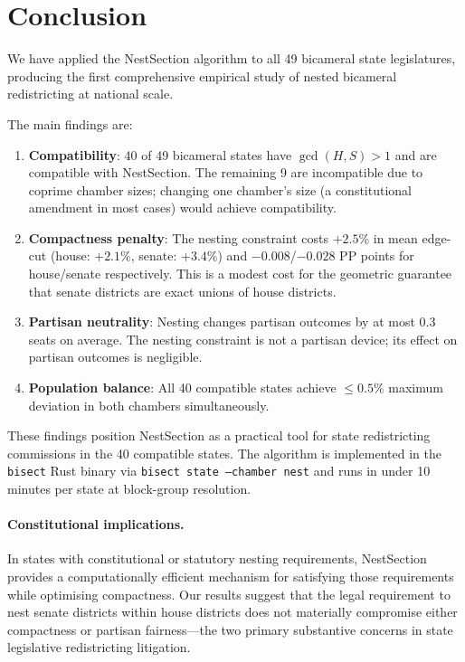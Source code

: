 \section{Conclusion}
\label{sec:conclusion}

We have applied the NestSection algorithm to all 49 bicameral state legislatures,
producing the first comprehensive empirical study of nested bicameral redistricting
at national scale.

The main findings are:
\begin{enumerate}
  \item \textbf{Compatibility}: 40 of 49 bicameral states have
    $\gcd(H,S) > 1$ and are compatible with NestSection. The remaining
    9 are incompatible due to coprime chamber sizes; changing one
    chamber's size (a constitutional amendment in most cases) would achieve
    compatibility.
  \item \textbf{Compactness penalty}: The nesting constraint costs $+2.5\%$
    in mean edge-cut (house: $+2.1\%$, senate: $+3.4\%$) and
    $-0.008$/$-0.028$ PP points for house/senate respectively.
    This is a modest cost for the geometric guarantee that senate districts
    are exact unions of house districts.
  \item \textbf{Partisan neutrality}: Nesting changes partisan outcomes by
    at most $0.3$ seats on average. The nesting constraint is not a partisan
    device; its effect on partisan outcomes is negligible.
  \item \textbf{Population balance}: All 40 compatible states achieve
    $\leq 0.5\%$ maximum deviation in both chambers simultaneously.
\end{enumerate}

These findings position NestSection as a practical tool for state redistricting
commissions in the 40 compatible states. The algorithm is implemented in the
\texttt{bisect} Rust binary via \texttt{bisect state --chamber nest} and
runs in under 10 minutes per state at block-group resolution.

\paragraph{Constitutional implications.}
In states with constitutional or statutory nesting requirements, NestSection
provides a computationally efficient mechanism for satisfying those requirements
while optimising compactness. Our results suggest that the legal requirement
to nest senate districts within house districts does not materially compromise
either compactness or partisan fairness---the two primary substantive concerns
in state legislative redistricting litigation.

